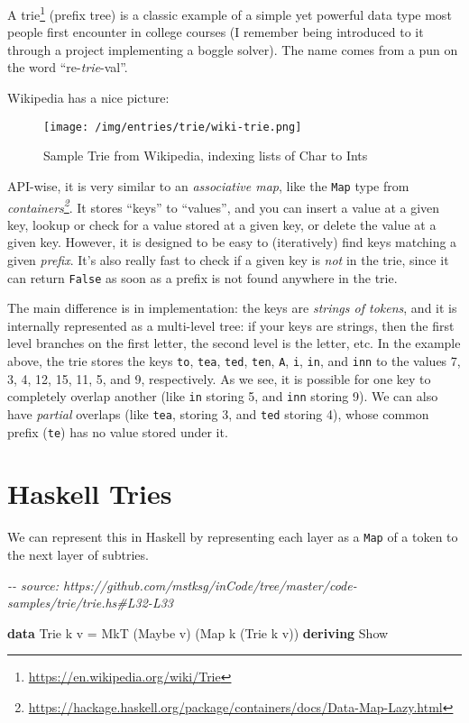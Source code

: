 \documentclass[]{article}
\newenvironment{Shaded}{}{}
\newcommand{\CommentTok}[1]{\textcolor[rgb]{0.38,0.63,0.69}{\textit{#1}}}
\newcommand{\DataTypeTok}[1]{\textcolor[rgb]{0.56,0.13,0.00}{#1}}
\newcommand{\KeywordTok}[1]{\textcolor[rgb]{0.00,0.44,0.13}{\textbf{#1}}}
\newcommand{\NormalTok}[1]{#1}
\newcommand{\OtherTok}[1]{\textcolor[rgb]{0.00,0.44,0.13}{#1}}
\renewcommand{\href}[2]{#2\footnote{\url{#1}}}
\begin{document}
A \href{https://en.wikipedia.org/wiki/Trie}{trie} (prefix tree) is a classic
example of a simple yet powerful data type most people first encounter in
college courses (I remember being introduced to it through a project
implementing a boggle solver). The name comes from a pun on the word
``re-\emph{trie}-val''.

Wikipedia has a nice picture:

\begin{figure}
\centering
\texttt{[image: /img/entries/trie/wiki-trie.png]}
\caption{Sample Trie from Wikipedia, indexing lists of Char to Ints}
\end{figure}

API-wise, it is very similar to an \emph{associative map}, like the \texttt{Map}
type from
\emph{\href{https://hackage.haskell.org/package/containers/docs/Data-Map-Lazy.html}{containers}}.
It stores ``keys'' to ``values'', and you can insert a value at a given key,
lookup or check for a value stored at a given key, or delete the value at a
given key. However, it is designed to be easy to (iteratively) find keys
matching a given \emph{prefix}. It's also really fast to check if a given key is
\emph{not} in the trie, since it can return \texttt{False} as soon as a prefix
is not found anywhere in the trie.

The main difference is in implementation: the keys are \emph{strings of tokens},
and it is internally represented as a multi-level tree: if your keys are
strings, then the first level branches on the first letter, the second level is
the letter, etc. In the example above, the trie stores the keys \texttt{to},
\texttt{tea}, \texttt{ted}, \texttt{ten}, \texttt{A}, \texttt{i}, \texttt{in},
and \texttt{inn} to the values 7, 3, 4, 12, 15, 11, 5, and 9, respectively. As
we see, it is possible for one key to completely overlap another (like
\texttt{in} storing 5, and \texttt{inn} storing 9). We can also have
\emph{partial} overlaps (like \texttt{tea}, storing 3, and \texttt{ted} storing
4), whose common prefix (\texttt{te}) has no value stored under it.

\section{Haskell Tries}\label{haskell-tries}

We can represent this in Haskell by representing each layer as a \texttt{Map} of
a token to the next layer of subtries.

\begin{Shaded}
\begin{Highlighting}[]
\CommentTok{{-}{-} source: https://github.com/mstksg/inCode/tree/master/code{-}samples/trie/trie.hs\#L32{-}L33}

\KeywordTok{data} \DataTypeTok{Trie}\NormalTok{  k v   }\OtherTok{=} \DataTypeTok{MkT}\NormalTok{  (}\DataTypeTok{Maybe}\NormalTok{ v) (}\DataTypeTok{Map}\NormalTok{ k (}\DataTypeTok{Trie}\NormalTok{ k v))}
  \KeywordTok{deriving} \DataTypeTok{Show}
\end{Highlighting}
\end{Shaded}
\end{document}
